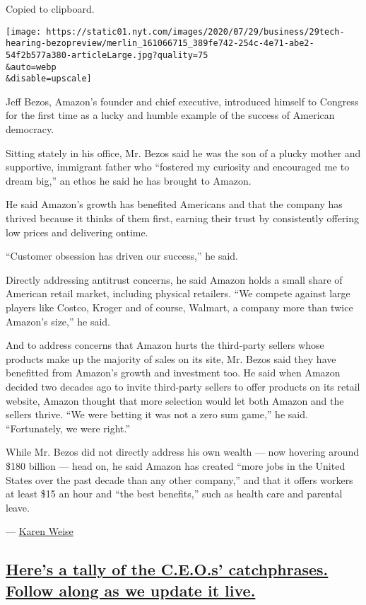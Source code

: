 Copied to clipboard.

\texttt{[image: https://static01.nyt.com/images/2020/07/29/business/29tech-hearing-bezopreview/merlin\_161066715\_389fe742-254c-4e71-abe2-54f2b577a380-articleLarge.jpg?quality=75\\\&auto=webp\\\&disable=upscale]}

Jeff Bezos, Amazon's founder and chief executive, introduced himself to
Congress for the first time as a lucky and humble example of the success
of American democracy.

Sitting stately in his office, Mr. Bezos said he was the son of a plucky
mother and supportive, immigrant father who ``fostered my curiosity and
encouraged me to dream big,'' an ethos he said he has brought to Amazon.

He said Amazon's growth has benefited Americans and that the company has
thrived because it thinks of them first, earning their trust by
consistently offering low prices and delivering ontime.

``Customer obsession has driven our success,'' he said.

Directly addressing antitrust concerns, he said Amazon holds a small
share of American retail market, including physical retailers. ``We
compete against large players like Costco, Kroger and of course,
Walmart, a company more than twice Amazon's size,'' he said.

And to address concerns that Amazon hurts the third-party sellers whose
products make up the majority of sales on its site, Mr. Bezos said they
have benefitted from Amazon's growth and investment too. He said when
Amazon decided two decades ago to invite third-party sellers to offer
products on its retail website, Amazon thought that more selection would
let both Amazon and the sellers thrive. ``We were betting it was not a
zero sum game,'' he said. ``Fortunately, we were right.''

While Mr. Bezos did not directly address his own wealth --- now hovering
around \$180 billion --- head on, he said Amazon has created ``more jobs
in the United States over the past decade than any other company,'' and
that it offers workers at least \$15 an hour and ``the best benefits,''
such as health care and parental leave.

--- \href{https://www.nytimes.com/by/karen-weise}{Karen Weise}

\hypertarget{heres-a-tally-of-the-ceos-catchphrases-follow-along-as-we-update-it-live}{%
\subsection{\texorpdfstring{\protect\hyperlink{what-ceos-said}{Here's a
tally of the C.E.O.s' catchphrases. Follow along as we update it
live.}}{Here's a tally of the C.E.O.s' catchphrases. Follow along as we update it live.}}\label{heres-a-tally-of-the-ceos-catchphrases-follow-along-as-we-update-it-live}}


